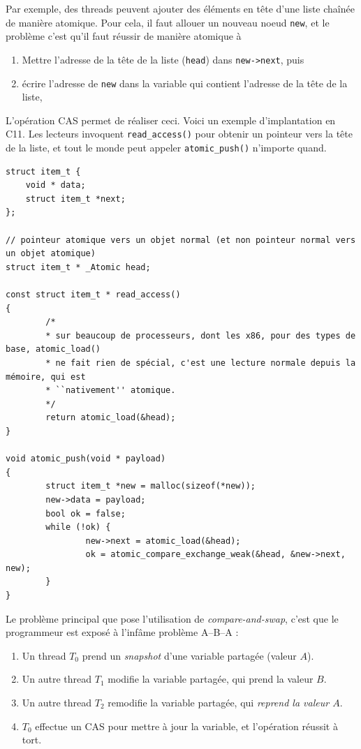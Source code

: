 Par exemple, des threads peuvent ajouter des éléments en tête d'une liste
chaînée de manière atomique. Pour cela, il faut allouer un nouveau noeud
\texttt{new}, et le problème c'est qu'il faut réussir de manière atomique à
\begin{enumerate}
\item Mettre l'adresse de la tête de la liste (\texttt{head}) dans
  \texttt{new->next}, puis
\item écrire l'adresse de \texttt{new} dans la variable qui contient l'adresse
  de la tête de la liste,
\end{enumerate}

\medskip

L'opération CAS permet de réaliser ceci. Voici un exemple d'implantation en
\textsf{C11}. Les lecteurs invoquent \texttt{read_access()} pour obtenir
un pointeur vers la tête de la liste, et tout le monde peut appeler
\texttt{atomic_push()} n'importe quand.

\begin{verbatim}
struct item_t {
    void * data;
    struct item_t *next;
};

// pointeur atomique vers un objet normal (et non pointeur normal vers un objet atomique)
struct item_t * _Atomic head;    

const struct item_t * read_access()
{
        /*
        * sur beaucoup de processeurs, dont les x86, pour des types de base, atomic_load()
        * ne fait rien de spécial, c'est une lecture normale depuis la mémoire, qui est
        * ``nativement'' atomique.
        */
        return atomic_load(&head);
}

void atomic_push(void * payload)
{
        struct item_t *new = malloc(sizeof(*new));
        new->data = payload;
        bool ok = false;
        while (!ok) {
                new->next = atomic_load(&head);
                ok = atomic_compare_exchange_weak(&head, &new->next, new);
        }
}
\end{verbatim}

Le problème principal que pose l'utilisation de \emph{compare-and-swap}, c'est
que le programmeur est exposé à l'infâme problème A--B--A :
\begin{enumerate}
\item Un thread $T_0$ prend un \emph{snapshot} d'une variable partagée (valeur $A$).
\item Un autre thread $T_1$ modifie la variable partagée, qui prend la valeur $B$.
\item Un autre thread $T_2$ remodifie la variable partagée, qui \emph{reprend la valeur $A$}.
\item $T_0$ effectue un CAS pour mettre à jour la variable, et l'opération réussit à tort.
\end{enumerate}
\medskip

